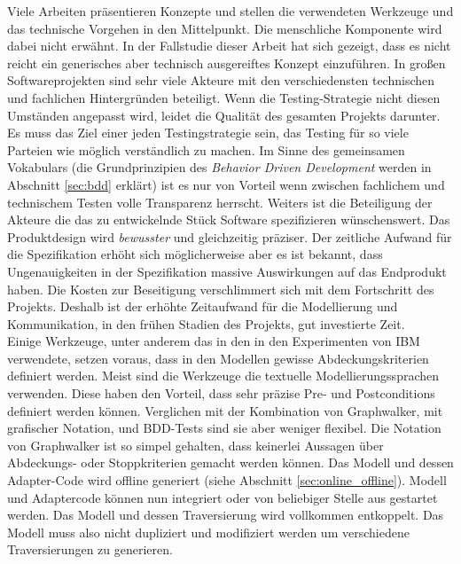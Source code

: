 Viele Arbeiten\cite{pretschner_one_2005}\cite{pinheiro_model-based_2013}\cite{sensler_testautomatisierung_2011} präsentieren Konzepte und stellen die verwendeten Werkzeuge und das technische Vorgehen in den Mittelpunkt. Die menschliche Komponente wird dabei nicht erwähnt. In der Fallstudie dieser Arbeit hat sich gezeigt, dass es nicht reicht ein generisches aber technisch ausgereiftes Konzept einzuführen. In großen Softwareprojekten sind sehr viele Akteure mit den verschiedensten technischen und fachlichen Hintergründen beteiligt. Wenn die Testing-Strategie nicht diesen Umständen angepasst wird, leidet die Qualität des gesamten Projekts darunter. Es muss das Ziel einer jeden Testingstrategie sein, das Testing für so viele Parteien wie möglich verständlich zu machen. Im Sinne des gemeinsamen Vokabulars (die Grundprinzipien des \textit{Behavior Driven Development} werden in Abschnitt \ref{sec:bdd} erklärt) ist es nur von Vorteil wenn zwischen fachlichem und technischem Testen volle Transparenz herrscht. Weiters ist die Beteiligung der Akteure die das zu entwickelnde Stück Software spezifizieren wünschenswert. Das Produktdesign wird \textit{bewusster} und gleichzeitig präziser. Der zeitliche Aufwand für die Spezifikation erhöht sich möglicherweise aber es ist bekannt, dass Ungenauigkeiten in der Spezifikation massive Auswirkungen auf das Endprodukt haben. Die Kosten zur Beseitigung verschlimmert sich mit dem Fortschritt des Projekts. Deshalb ist der erhöhte Zeitaufwand für die Modellierung und Kommunikation, in den frühen Stadien des Projekts, gut investierte Zeit.\\
Einige Werkzeuge, unter anderem das in den in den Experimenten von IBM\cite{farchi_using_2002} verwendete, setzen voraus, dass in den Modellen gewisse Abdeckungskriterien definiert werden. Meist sind die Werkzeuge die textuelle Modellierungssprachen verwenden. Diese haben den Vorteil, dass sehr präzise Pre- und Postconditions definiert werden können. Verglichen mit der Kombination von Graphwalker, mit grafischer Notation, und BDD-Tests sind sie aber weniger flexibel. Die Notation von Graphwalker ist so simpel gehalten, dass keinerlei Aussagen über Abdeckungs- oder Stoppkriterien gemacht werden können. Das Modell und dessen Adapter-Code wird offline generiert (siehe Abschnitt  \ref{sec:online_offline}). Modell und Adaptercode können nun integriert oder von beliebiger Stelle aus gestartet werden. Das Modell und dessen Traversierung wird vollkommen entkoppelt. Das Modell muss also nicht dupliziert und modifiziert werden um verschiedene Traversierungen zu generieren.\\
